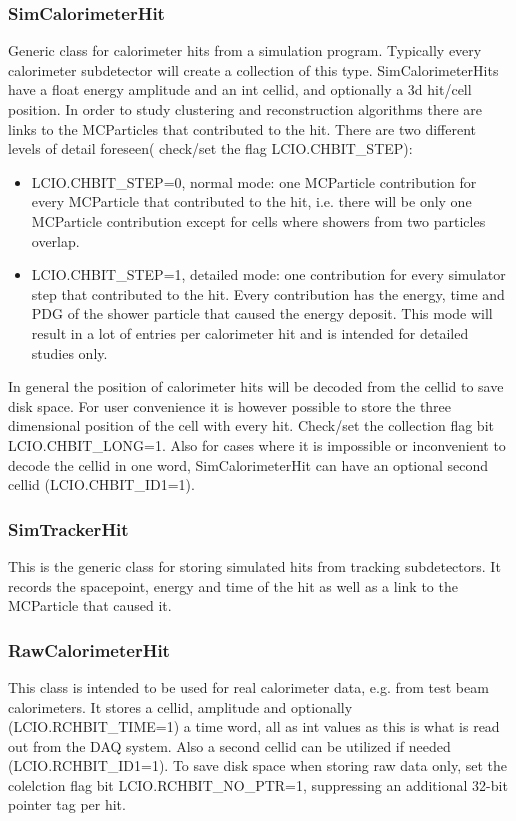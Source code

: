 \documentclass[twoside]{article}
\begin{document}
\subsubsection{SimCalorimeterHit}
Generic class for calorimeter hits from a simulation program. Typically every calorimeter subdetector
will create a collection of this type. SimCalorimeterHits have a float energy amplitude and an int cellid,
and optionally a 3d hit/cell position. 
In order to study clustering and reconstruction algorithms there are links to the MCParticles that contributed 
to the hit. There are two different levels of detail foreseen( check/set the flag LCIO.CHBIT\_STEP):
\begin{itemize}
\item{LCIO.CHBIT\_STEP=0, normal mode: one MCParticle contribution for every MCParticle that contributed to the 
hit, i.e. there will be only one MCParticle contribution except for cells where showers from two particles 
overlap.}
\item{LCIO.CHBIT\_STEP=1, detailed mode: one contribution for every simulator step that contributed to the hit.
Every contribution has the energy, time and PDG of the shower particle that caused  the energy deposit.
This mode will result in a lot of entries per calorimeter hit and is intended for detailed studies only. }
\end{itemize}
In general the position of calorimeter hits will be decoded from the cellid to save disk space. For user 
convenience it is however possible to store the three dimensional position of the cell with every hit.
Check/set the collection flag bit LCIO.CHBIT\_LONG=1.
Also for cases where it is impossible or inconvenient to decode the cellid in one word, SimCalorimeterHit can have 
an optional second cellid (LCIO.CHBIT\_ID1=1). 

\subsubsection{SimTrackerHit}
This is the generic class for storing simulated hits from tracking subdetectors. It records the spacepoint,  
energy and time of the hit as well as a link to the MCParticle that caused it.

\subsubsection{RawCalorimeterHit}
This class is intended to be used for real calorimeter data, e.g. from test beam calorimeters.
It stores a cellid, amplitude and optionally (LCIO.RCHBIT\_TIME=1) a time word, all as int values as 
this is what is read out from the DAQ system. Also a second cellid can be utilized if needed (LCIO.RCHBIT\_ID1=1).
To save disk space when storing raw data only, set the colelction flag bit LCIO.RCHBIT\_NO\_PTR=1, 
suppressing an additional 32-bit  pointer tag per hit.
\end{document}
